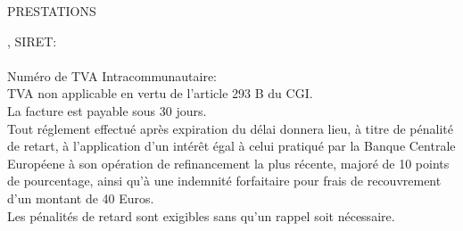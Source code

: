 \documentclass{invoice}
\begin{document}
\vspace{100 pt}

\hspace{8 pt}\color{gray}\MakeUppercase{Prestations}\\[-1.6ex]
\hline

\color{black}





\vspace{1 cm}
\vspace*{\fill}
  \begin{center}
    \footnotesize{, SIRET: }\\
    \footnotesize{}\\
    \footnotesize{Numéro de TVA Intracommunautaire: }\\
    \footnotesize{
        TVA non applicable en vertu de l'article 293 B du CGI.
    }\\
    \footnotesize{La facture est payable sous 30 jours.}\\
    \footnotesize{Tout réglement effectué après expiration du délai donnera lieu, à titre de pénalité de retart, à l'application
    d'un intérêt égal à celui pratiqué par la Banque Centrale Européene à son opération de refinancement la plus récente,
    majoré de 10 points de pourcentage, ainsi qu'à une indemnité forfaitaire pour frais de recouvrement d'un montant de 40 Euros.}\\
    \footnotesize{Les pénalités de retard sont exigibles sans qu'un rappel soit nécessaire.}
  \end{center}
\end{document}
